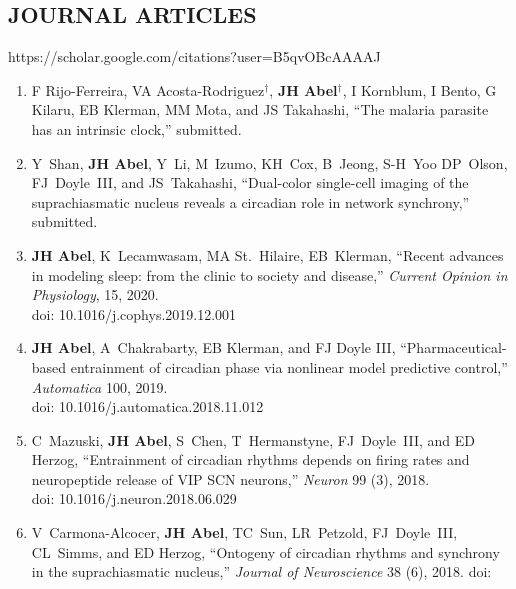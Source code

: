 \documentclass[line,10pt]{res}
\begin{document}
\begin{resume}
\section{\bf JOURNAL ARTICLES}
\vspace{0.5em}
https://scholar.google.com/citations?user=B5qvOBcAAAAJ
\vspace{1em}
\begin{enumerate}
    \setlength\itemsep{0.8em}
    \item F Rijo-Ferreira, VA Acosta-Rodriguez$^\dagger$, \textbf{JH Abel}$^\dagger$, I Kornblum, I Bento, G Kilaru, EB Klerman, MM Mota, and JS Takahashi, ``The malaria parasite has an intrinsic clock,'' submitted.
    \item Y~Shan, \textbf{JH Abel}, Y~Li, M~Izumo, KH~Cox, B~Jeong, {S-H}~Yoo DP~Olson, FJ~Doyle~III, and JS~Takahashi, ``Dual-color single-cell imaging of the suprachiasmatic nucleus reveals a circadian role in network synchrony,'' submitted.
        \item \textbf{JH Abel}, K~Lecamwasam, MA St.\ Hilaire, EB~Klerman, ``Recent advances in modeling sleep: from the clinic to society and disease,'' 
    \textit{Current Opinion in Physiology}, 
    15, 2020. \\doi: 10.1016/j.cophys.2019.12.001
    \item \textbf{JH Abel}, A~Chakrabarty, EB Klerman, and FJ Doyle III, ``Pharmaceutical-based entrainment of circadian phase via nonlinear model predictive
	    control,'' \textit{Automatica} 100, 2019. \\doi: %
    10.1016/j.automatica.2018.11.012%
    \item C~Mazuski, \textbf{JH Abel}, S~Chen, T~Hermanstyne, FJ~Doyle~III, and ED Herzog, ``Entrainment of circadian rhythms depends on firing rates and neuropeptide release of VIP SCN neurons,'' \textit{Neuron} 99 (3), 2018.\\ doi: %
    10.1016/j.neuron.2018.06.029%
    \item V~Carmona-Alcocer, \textbf{JH Abel}, TC~Sun, LR~Petzold, FJ~Doyle~III, CL~Simms, and ED Herzog, ``Ontogeny of circadian rhythms and synchrony in the suprachiasmatic nucleus,'' \textit{Journal of Neuroscience} 38 (6), 2018. doi: %

\end{enumerate}
\end{resume}
\end{document}
